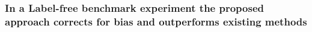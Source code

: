 \documentclass[mcp]{article}
\numberwithin{table}{section}
\def\todo#1{{\color{red}[#1]}}
\begin{document}


\subsubsection*{In a Label-free benchmark experiment the proposed approach corrects for bias and outperforms existing methods}
\end{document}
